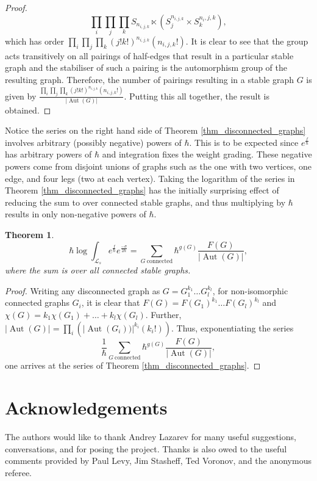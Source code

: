 \documentclass[]{amsart}
\newtheorem{theorem}{Theorem}[section]
\theoremstyle{definition}
\begin{document}
\begin{proof}
\[
\prod_i \prod_ j \prod_k S_{n_{i,j,k}} \ltimes (S_j^{n_{i,j,k}}\times S_k^{n_i,j,k}),
\]
which has order $\prod_i \prod_j \prod_k (j!k!)^{n_{i,j,k}} (n_{i,j,k}!)$. It is clear to see that the group acts transitively on all pairings of half-edges that result in a particular stable graph and the stabiliser of such a pairing is the automorphism group of the resulting graph. Therefore, the number of pairings resulting in a stable graph $G$ is given by $\frac{\prod_i \prod_j \prod_k (j!k!)^{n_{i,j,k}} (n_{i,j,k}!)}{|\operatorname{Aut}(G)|}$. Putting this all together, the result is obtained.
\end{proof}

Notice the series on the right hand side of Theorem \ref{thm_disconnected_graphs} involves arbitrary (possibly negative) powers of $\hbar$. This is to be expected since $e^{\frac{f}{\hbar}}$ has arbitrary powers of $\hbar$ and integration fixes the weight grading. These negative powers come from disjoint unions of graphs such as the one with two vertices, one edge, and four legs (two at each vertex). Taking the logarithm of the series in Theorem \ref{thm_disconnected_graphs} has the initially surprising effect of reducing the sum to over connected stable graphs, and thus multiplying by $\hbar$ results in only non-negative powers of $\hbar$.

\begin{theorem}\label{thm_connected_graphs}
\[
\hbar \log \int_{\mathcal{L}_s} e^{\frac{f}{\hbar}} e^{\frac{-\sigma}{2 \hbar} } = \sum_{G\mathrm{~connected}} \hbar^{g(G)} \frac{F(G)}{|\operatorname{Aut}(G)|},
\]
where the sum is over all connected stable graphs.
\end{theorem}
\begin{proof}
Writing any disconnected graph as $G=G_1^{k_1} \dots G_l^{k_l}$, for non-isomorphic connected graphs $G_i$, it is clear that $F (G) =F( G_1 )^{k_1} \dots F (G_l )^{k_l}$ and $\chi (G) = k_1 \chi(G_1) + \dots + k_l \chi (G_l)$. Further, $|\operatorname{Aut}(G)|= \prod_i \left( |\operatorname{Aut}(G_i))|^{k_i} ({k_i}!) \right)$. Thus, exponentiating the series
\[
\frac{1}{\hbar} \sum_{G\mathrm{~connected}} \hbar^{g(G)} \frac{F(G)}{|\operatorname{Aut}(G)|},
\]
one arrives at the series of Theorem \ref{thm_disconnected_graphs}.
\end{proof}

\section*{Acknowledgements}

The authors would like to thank Andrey Lazarev for many useful suggestions, conversations, and for posing the project. Thanks is also owed to the useful comments provided by Paul Levy, Jim Stasheff, Ted Voronov, and the anonymous referee.



\end{document}
